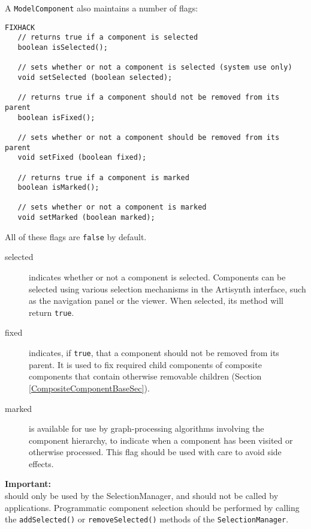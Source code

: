 \documentclass{article}
\begin{document}
A {\tt ModelComponent} also maintains a number of flags:
\begin{lstlisting}FIXHACK
   // returns true if a component is selected
   boolean isSelected();

   // sets whether or not a component is selected (system use only)
   void setSelected (boolean selected);

   // returns true if a component should not be removed from its parent
   boolean isFixed();

   // sets whether or not a component should be removed from its parent
   void setFixed (boolean fixed);

   // returns true if a component is marked
   boolean isMarked();

   // sets whether or not a component is marked
   void setMarked (boolean marked);
\end{lstlisting}

All of these flags are {\tt false} by default.

\begin{description}

\item [selected] indicates whether or not a component is selected.
Components can be selected using various selection mechanisms in
the Artisynth interface, such as the navigation panel or the viewer.
When selected, its  method
will return {\tt true}. 

\item [fixed] indicates, if {\tt true}, that a component should
not be removed from its parent. It is used to fix required child
components of composite components that contain otherwise removable
children (Section \ref{CompositeComponentBaseSec}).

\item [marked] is available for use by graph-processing
algorithms involving the component hierarchy, to indicate when a
component has been visited or otherwise processed. This flag should be
used with care to avoid side effects.

\end{description}

\begin{sideblock}
{\bf Important:}\\
 should only be used by the
SelectionManager, and should not be called by
applications. Programmatic component selection should be performed by
calling the {\tt addSelected()} or {\tt removeSelected()} methods of the
{\tt SelectionManager}.
\end{sideblock}
\end{document}
